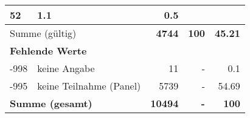 \begin{longtable}{lXrrr}
       \num{52} &
       \num[round-mode=places,round-precision=2]{1.1} &
         \num[round-mode=places,round-precision=2]{0.5} \\
     \midrule
     \multicolumn{2}{l}{Summe (gültig)} &
       \textbf{\num{4744}} &
     \textbf{\num{100}} &
       \textbf{\num[round-mode=places,round-precision=2]{45.21}} \\
     \multicolumn{5}{l}{\textbf{Fehlende Werte}}\\
       -998 &
       keine Angabe &
         \num{11} &
        - &
         \num[round-mode=places,round-precision=2]{0.1} \\
       -995 &
       keine Teilnahme (Panel) &
         \num{5739} &
        - &
         \num[round-mode=places,round-precision=2]{54.69} \\
     \midrule
     \multicolumn{2}{l}{\textbf{Summe (gesamt)}} &
          \textbf{\num{10494}} &
        \textbf{-} &
        \textbf{\num{100}} \\
     \bottomrule
     \end{longtable}
     
